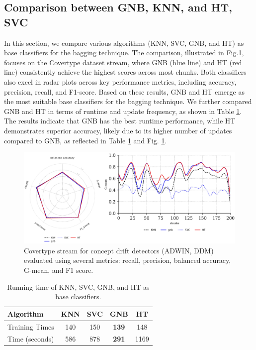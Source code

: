 \subsection{Comparison between GNB, KNN, and HT, SVC}
\label{sec:compared_base_calssfier}
In this section, we compare various algorithms (KNN, SVC, GNB, and HT) as base classifiers for the bagging technique. The comparison, illustrated in Fig.\ref{fig:res4}, focuses on the Covertype dataset stream, where GNB (blue line) and HT (red line) consistently achieve the highest scores across most chunks. Both classifiers also excel in radar plots across key performance metrics, including accuracy, precision, recall, and F1-score. Based on these results, GNB and HT emerge as the most suitable base classifiers for the bagging technique. We further compared GNB and HT in terms of runtime and update frequency, as shown in Table \ref{table:table_3}. The results indicate that GNB has the best runtime performance, while HT demonstrates superior accuracy, likely due to its higher number of updates compared to GNB, as reflected in Table \ref{table:table_3} and Fig. \ref{fig:res4}.

\begin{figure}[t]
	\centering
	\includegraphics[width=1\linewidth]{5_Emerging/images/res4.png}
	\caption{Covertype stream for concept drift detectors (ADWIN, DDM) evaluated using several metrics: recall, precision, balanced accuracy, G-mean, and F1 score.}

	\label{fig:res4}
\end{figure}				

	
\begin{table}[t]
	\centering
	\begin{tabular}{|l|c|c|c|c|}
	\hline
	\textbf{Algorithm}     & \textbf{KNN} & \textbf{SVC} & \textbf{GNB} & \textbf{HT} \\ \hline
		Training Times         & 140          & 150          & \textbf{139} & 148         \\ \hline
		Time (seconds)         & 586          & 878          & \textbf{291} & 1169        \\ \hline
	\end{tabular}
	\caption{Running time of KNN, SVC, GNB, and HT as base classifiers.}
	\label{table:table_3}
	\end{table}


